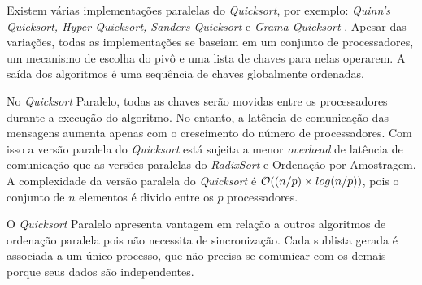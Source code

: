 Existem várias implementações paralelas do \textit{Quicksort}, por exemplo: \textit{Quinn's Quicksort, Hyper Quicksort, Sanders Quicksort} e  \textit{Grama Quicksort} \cite{Quinn:1994, Sanders:1997}. Apesar das variações, todas as implementações se baseiam em um conjunto de processadores, um mecanismo de escolha do pivô e uma lista de chaves para nelas operarem. A saída dos algoritmos é uma sequência de chaves globalmente ordenadas. 



No \textit{Quicksort} Paralelo, todas as chaves serão movidas entre os processadores durante a execução do algoritmo. No entanto, a latência de comunicação das mensagens aumenta apenas com o crescimento do número de processadores. Com isso a versão paralela do \textit{Quicksort} está sujeita a menor \textit{overhead} de latência de comunicação que as versões paralelas do \textit{RadixSort} e Ordenação por Amostragem. A complexidade da versão paralela do \textit{Quicksort} é ${\cal O}((n/p) \times log(n/p))$, pois o conjunto de $n$ elementos é divido entre os $p$ processadores.  

O \textit{Quicksort} Paralelo apresenta vantagem em relação a outros algoritmos de ordenação paralela pois 
não necessita de sincronização. Cada sublista gerada é associada a um único processo, que não precisa se comunicar com os demais porque seus dados são independentes. 
